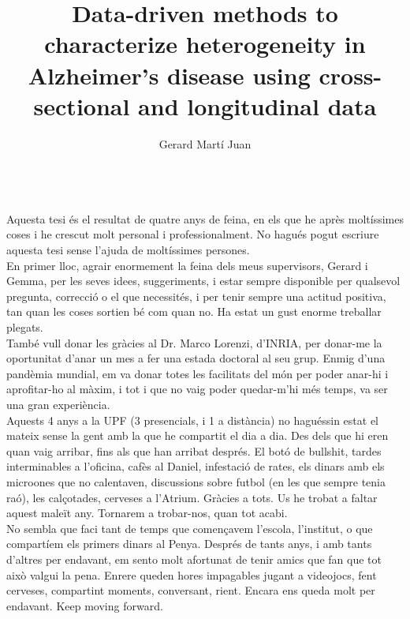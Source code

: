 \documentclass[12pt, b5paper,twoside]{tesi_upf}
\title{Data-driven methods to characterize heterogeneity in Alzheimer’s disease using cross-sectional and longitudinal data}
\author{Gerard Martí Juan}
\begin{document}
\frontmatter
\maketitle

\cleardoublepage





 \\
Aquesta tesi és el resultat de quatre anys de feina, en els que he après moltíssimes coses i he crescut molt personal i professionalment. No hagués pogut escriure aquesta tesi sense l'ajuda de moltíssimes persones. \\

En primer lloc, agrair enormement la feina dels meus supervisors, Gerard i Gemma, per les seves idees, suggeriments, i estar sempre disponible per qualsevol pregunta, correcció o el que necessités, i per tenir sempre una actitud positiva, tan quan les coses sortien bé com quan no. Ha estat un gust enorme treballar plegats. \\

També vull donar les gràcies al Dr. Marco Lorenzi, d'INRIA, per donar-me la oportunitat d'anar un mes a fer una estada doctoral al seu grup. Enmig d'una pandèmia mundial, em va donar totes les facilitats del món per poder anar-hi i aprofitar-ho al màxim, i tot i que no vaig poder quedar-m'hi més temps, va ser una gran experiència. \\

Aquests 4 anys a la UPF (3 presencials, i 1 a distància) no haguéssin estat el mateix sense la gent amb la que he compartit el dia a dia. Des dels que hi eren quan vaig arribar, fins als que han arribat després. El botó de bullshit, tardes interminables a l'oficina, cafès al Daniel, infestació de rates, els dinars amb els microones que no calentaven, discussions sobre futbol (en les que sempre tenia raó), les calçotades, cerveses a l'Atrium. Gràcies a tots. Us he trobat a faltar aquest maleït any. Tornarem a trobar-nos, quan tot acabi. \\

No sembla que faci tant de temps que començavem l'escola, l'institut, o que compartíem els primers dinars al Penya. Després de tants anys, i amb tants d'altres per endavant, em sento molt afortunat de tenir amics que fan que tot això valgui la pena. Enrere queden hores impagables jugant a videojocs, fent cerveses, compartint moments, conversant, rient. Encara ens queda molt per endavant. Keep moving forward. \\
\end{document}
